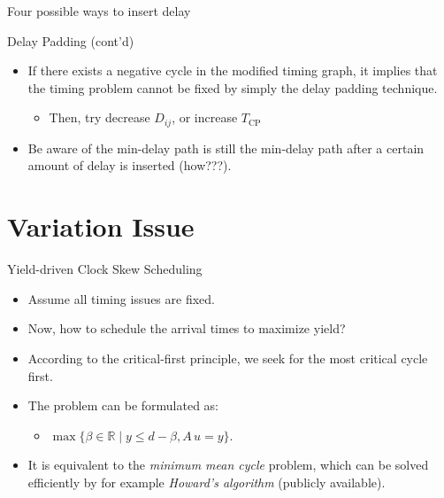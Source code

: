\documentclass[
  ignorenonframetext,
]{beamer}
\providecommand{\tightlist}{%
  \setlength{\itemsep}{0pt}\setlength{\parskip}{0pt}}
\begin{document}
\begin{frame}{Four possible ways to insert delay}
\protect\hypertarget{four-possible-ways-to-insert-delay}{}
\begin{figure}[htpb]
\centering
{}
\subfigure[$p_s$, $p_h$ independently]{

}
\subfigure[$p_s = p_h$]{

}
\subfigure[$p_s \geq p_h$]{

}
\caption{}
\end{figure}
\end{frame}

\begin{frame}{Delay Padding (cont'd)}
\protect\hypertarget{delay-padding-contd}{}
\begin{itemize}
\tightlist
\item
  If there exists a negative cycle in the modified timing graph, it
  implies that the timing problem cannot be fixed by simply the delay
  padding technique.

  \begin{itemize}
  \tightlist
  \item
    Then, try decrease \(D_{ij}\), or increase \(T_\text{CP}\)
  \end{itemize}
\item
  Be aware of the min-delay path is still the min-delay path after a
  certain amount of delay is inserted (how???).
\end{itemize}
\end{frame}

\hypertarget{variation-issue}{%
\section{Variation Issue}\label{variation-issue}}

\begin{frame}{Yield-driven Clock Skew Scheduling}
\protect\hypertarget{yield-driven-clock-skew-scheduling}{}
\begin{itemize}
\tightlist
\item
  Assume all timing issues are fixed.
\item
  Now, how to schedule the arrival times to maximize yield?
\item
  According to the critical-first principle, we seek for the most
  critical cycle first.
\item
  The problem can be formulated as:

  \begin{itemize}
  \tightlist
  \item
    \(\max\{\beta \in \mathbb{R} \mid y \leq d - \beta, A\,u = y\}\).
  \end{itemize}
\item
  It is equivalent to the \emph{minimum mean cycle} problem, which can
  be solved efficiently by for example \emph{Howard's algorithm}
  (publicly available).
\end{itemize}
\end{frame}
\end{document}
